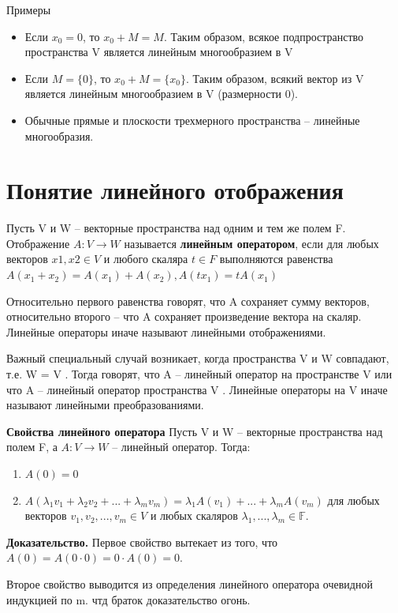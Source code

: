 \documentclass[a4paper]{article}
\begin{document}
{\begin{small}
Примеры
\begin{itemize}
\item Если $x_0 = 0$, то $x_0 + M = M$. Таким образом, всякое
подпространство пространства V является линейным многообразием в V
\item Если $M = \{ 0 \}$, то $x_0 + M = \{ x_0 \}$. Таким образом, всякий
вектор из V является линейным многообразием в V (размерности 0).
\item Обычные прямые и плоскости трехмерного пространства –
линейные многообразия.
\end{itemize}

\section*{Понятие линейного отображения}

Пусть V и W – векторные пространства над одним и тем же полем F.
Отображение $A: V \rightarrow W$ называется \textbf{линейным оператором}, если
для любых векторов $x1, x2 \in V$ и любого скаляра $t \in F$ выполняются
равенства $A(x_1+x_2) = A(x_1) + A(x_2), A(tx_1) = tA(x_1)$

Относительно первого равенства говорят, что A сохраняет сумму векторов,
относительно второго – что A сохраняет произведение вектора на скаляр.
Линейные операторы иначе называют линейными отображениями.

Важный специальный случай возникает, когда пространства V и W
совпадают, т.е. W = V . Тогда говорят, что A – линейный оператор
на пространстве V или что A – линейный оператор пространства V .
Линейные операторы на V иначе называют линейными преобразованиями.

\textbf{Свойства линейного оператора}
Пусть V и W – векторные пространства над полем F, а $A: V \rightarrow W$ –
линейный оператор. Тогда:
\begin{enumerate}
\item $A(0) = 0$
\item $A(\lambda_1v_1 + \lambda_2v_2 + ... + \lambda_mv_m) = \lambda_1A(v_1)+...+\lambda_m A(v_m)$ для любых векторов $v_1,v_2, ..., v_m \in V$ и любых скаляров $\lambda_1, ..., \lambda_m \in \mathbb{F}$.
\end{enumerate}

\textbf{Доказательство.} Первое свойство вытекает из того, что $A(0) = A(0 \cdot 0) = 0 \cdot A(0) = 0$.

Второе свойство выводится из определения линейного оператора очевидной индукцией по m. чтд браток доказательство огонь.


\end{small}}
\end{document}
